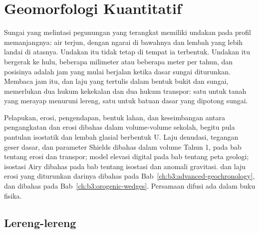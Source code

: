 \chapter{Geomorfologi Kuantitatif}\label{ch:b3:quantitative-geomorphology}

Sungai yang melintasi pegunungan yang terangkat memiliki undakan pada profil memanjangnya: air terjun,
dengan ngarai di bawahnya dan lembah yang lebih landai di atasnya. Undakan itu tidak tetap
di tempat ia terbentuk. Undakan itu bergerak ke hulu, beberapa milimeter atau beberapa meter
per tahun, dan posisinya adalah jam yang mulai berjalan ketika dasar sungai
diturunkan. Membaca jam itu, dan laju yang tertulis dalam bentuk bukit
dan sungai, memerlukan dua hukum kekekalan dan dua hukum transpor: satu untuk
tanah yang merayap menuruni lereng, satu untuk batuan dasar yang dipotong sungai.

\begin{recall}
Pelapukan, erosi, pengendapan, bentuk lahan, dan keseimbangan antara pengangkatan
dan erosi dibahas dalam volume-volume sekolah, begitu pula pantulan isostatik dan lembah
glasial berbentuk U. Laju denudasi, tegangan geser dasar, dan parameter Shields
dibahas dalam volume Tahun 1, pada bab tentang erosi dan transpor;
model elevasi digital pada bab tentang peta geologi; isostasi Airy
dibahas pada bab tentang isostasi dan anomali gravitasi. 
dan laju erosi yang diturunkan darinya dibahas pada
Bab~\ref{ch:b3:advanced-geochronology},  dan
 dibahas pada Bab~\ref{ch:b3:orogenic-wedges}. Persamaan
difusi ada dalam buku fisika.
\end{recall}

\section{Lereng-lereng}\label{sec:b3:quantitative-geomorphology:hillslopes}

